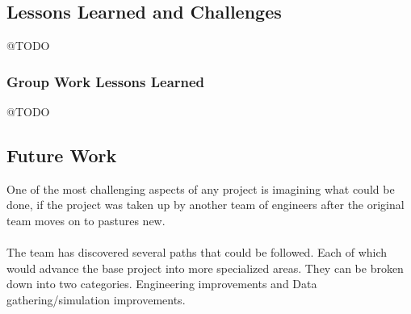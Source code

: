 \documentclass[11pt]{article}
\begin{document}
\subsection{Lessons Learned and Challenges} 
@TODO


\subsubsection{Group Work Lessons Learned}
@TODO

	
\subsection{Future Work} 
One of the most challenging aspects of any project is imagining what could be done, if the project was taken up by another team of engineers after the original team moves on to pastures new.
\\~\\
The team has discovered several paths that could be followed. Each of which would advance the base project into more specialized areas.
They can be broken down into two categories. Engineering improvements and Data gathering/simulation improvements.
\end{document}
